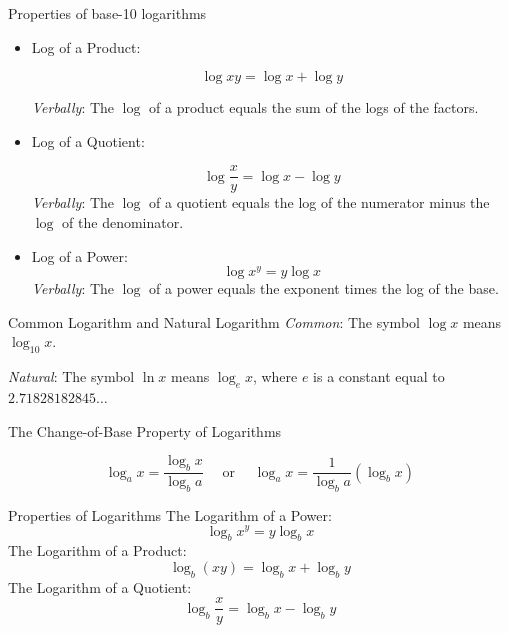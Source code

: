 \begin{custombox}{Properties of base-10 logarithms}
\begin{itemize}
    \item Log of a Product:
    
    \[
    \log x y=\log x+\log y
    \]
    
    \textit{Verbally}: The $\log$ of a product equals the sum of the logs of the factors.
    \vspace{0.2cm}
    \item Log of a Quotient:
    
    \[
    \log \frac{x}{y}=\log x-\log y
    \]
    \vspace{0.1cm}
    \textit{Verbally}: The $\log$ of a quotient equals the log of the numerator minus the $\log$ of the denominator.
    \vspace{0.2cm}
    \item Log of a Power:
    \[
    \log x^y=y \log x
    \]
    \textit{Verbally}: The $\log$ of a power equals the exponent times the log of the base.
\end{itemize}

   
\end{custombox}

\begin{definition}{Common Logarithm and Natural Logarithm}
\hspace{1cm} \textit{Common}: The symbol $\log x$ means $\log _{10} x$.

\hspace{1cm}  \textit{Natural}: \hspace{0.2cm}The symbol $\ln x$ means $\log _e x$, where $e$ is a constant equal to $2.71828182845 \ldots$
\end{definition}

\begin{custombox}{The Change-of-Base Property of Logarithms}

\begin{equation*}
\log _a x=\frac{\log _b x}{\log _b a} \quad \text { or } \quad \log _a x=\frac{1}{\log _b a}\left(\log _b x\right)
\end{equation*}
    
\end{custombox}

\begin{custombox}{Properties of Logarithms}
\setlength{\leftskip}{1cm}  %
\setlength{\rightskip}{1cm} %
The Logarithm of a Power:
$$
\log _b x^y=y \log _b x
$$
The Logarithm of a Product:
$$
\log _b(x y)=\log _b x+\log _b y
$$
The Logarithm of a Quotient:
$$
\log _b \frac{x}{y}=\log _b x-\log _b y
$$
\setlength{\leftskip}{0cm}  %
\setlength{\rightskip}{0cm} %

\end{custombox}

